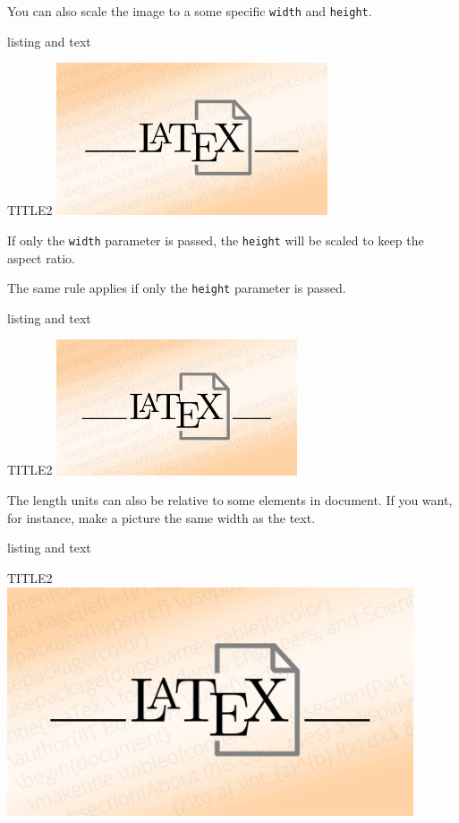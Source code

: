 \documentclass[]{myHOWTO-V001}
\begin{document}
You can also scale the image to a some specific \Verb|width| and \Verb|height|. \cite{Overleaf2023}

\begin{myTEXEXdoclst}{}{listing and text}
\centering
\begin{myFIGlst}{TITLE2}{}
	\includegraphics[width=80mm]{LaTeX.jpg}
\end{myFIGlst}
\end{myTEXEXdoclst}

If only the \Verb|width| parameter is passed, the \Verb|height| will be scaled to keep the aspect ratio. \cite{Overleaf2023}

The same rule applies if only the \Verb|height| parameter is passed.

\begin{myTEXEXdoclst}{}{listing and text}
\centering
\begin{myFIGlst}{TITLE2}{}
	\includegraphics[height=40mm]{LaTeX.jpg}
\end{myFIGlst}
\end{myTEXEXdoclst}

The length units can also be relative to some elements in document. If you want, for instance, make a picture the same width as the text. \cite{Overleaf2023}

\begin{myTEXEXdoclst}{}{listing and text}
\centering
\begin{myFIGlst}{TITLE2}{}
	\includegraphics[width=0.9\textwidth]{LaTeX.jpg}
\end{myFIGlst}
\end{myTEXEXdoclst}
\end{document}

